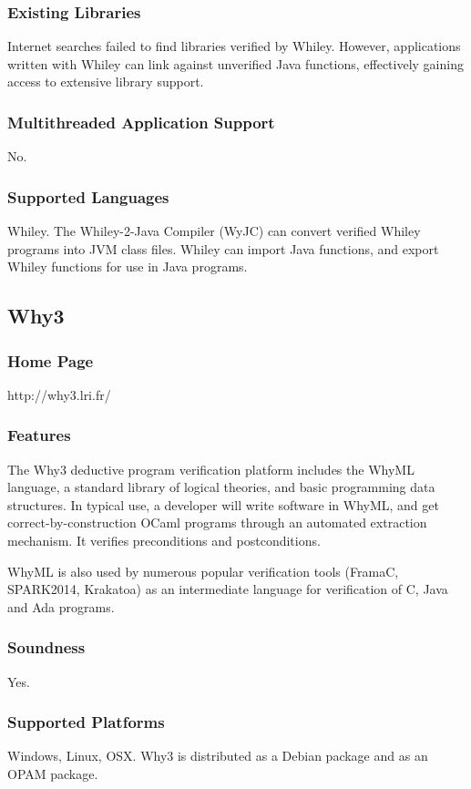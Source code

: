 \documentclass[11pt]{article}
\begin{document}
	\subsubsection{Existing Libraries}
		Internet searches failed to find libraries verified by Whiley. However, applications written with Whiley can link against unverified Java functions, effectively gaining access to extensive library support.
	\subsubsection{Multithreaded Application Support}
	No.
	\subsubsection{Supported Languages}
	Whiley. The Whiley-2-Java Compiler (WyJC) can convert verified Whiley programs into JVM class files. Whiley can import Java functions, and export Whiley functions for use in Java programs.






\subsection{Why3}
	\subsubsection{Home Page}
	http://why3.lri.fr/
	\subsubsection{Features}
	The Why3 deductive program verification platform includes the WhyML language, a standard library of logical theories, and basic programming data structures\cite{why3homepage}. In typical use, a developer will write software in WhyML, and get correct-by-construction OCaml programs through an automated extraction mechanism. It verifies preconditions and postconditions.
	
	WhyML is also used by numerous popular verification tools (FramaC, SPARK2014, Krakatoa) as an intermediate language for verification of C, Java and Ada programs.
	\subsubsection{Soundness}
	Yes.
	\subsubsection{Supported Platforms}
	Windows, Linux, OSX. Why3 is distributed as a Debian package and as an OPAM package.
	
\end{document}
